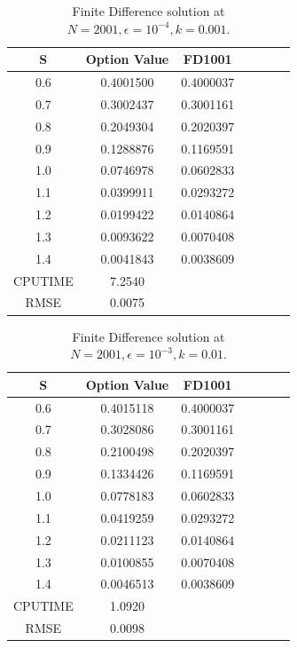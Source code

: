 \documentclass[12pt]{article}
\numberwithin{equation}{subsection} %
\begin{document}
\newpage
\begin{table}[h]
\centering \caption{Finite Difference solution at
$N=2001,\epsilon=10^{-4},k=0.001$.}\label{Tab_1}
 \vspace{5mm}
\begin{tabular}{|c|c|c|c|c|c|c|}
  \hline
  S & Option Value & FD1001\\
  \hline

  0.6 & 0.4001500&0.4000037  \\
  0.7 &0.3002437 &0.3001161 \\
  0.8 &0.2049304&0.2020397 \\
  0.9 &0.1288876&0.1169591 \\
  1.0 &0.0746978 &0.0602833 \\
  1.1 &0.0399911&0.0293272  \\
  1.2 &0.0199422&0.0140864   \\
  1.3 & 0.0093622&0.0070408  \\
  1.4& 0.0041843&0.0038609\\
  \hline
CPUTIME&7.2540& \\
\hline
 RMSE&0.0075&\\
  \hline


\end{tabular}
\end{table}




\begin{table}[h]
\centering
  \caption{Finite Difference solution at $N=2001,\epsilon=10^{-3},k=0.01$.}\label{Tab1_}
\vspace{5mm}
\begin{tabular}{|c|c|c|c|c|c|c|}
  \hline
  S & Option Value & FD1001 \\
  \hline

  0.6 & 0.4015118&0.4000037  \\
  0.7 &0.3028086&0.3001161 \\
  0.8 & 0.2100498&0.2020397\\
  0.9 & 0.1334426&0.1169591\\
  1.0 &  0.0778183&0.0602833\\
  1.1 & 0.0419259&0.0293272\\
  1.2 &  0.0211123&0.0140864\\
  1.3 & 0.0100855&0.0070408  \\
  1.4&0.0046513&0.0038609 \\
 \hline
CPUTIME&1.0920&\\
\hline
 RMSE&0.0098& \\
  \hline
\end{tabular}
\end{table}
\end{document}
